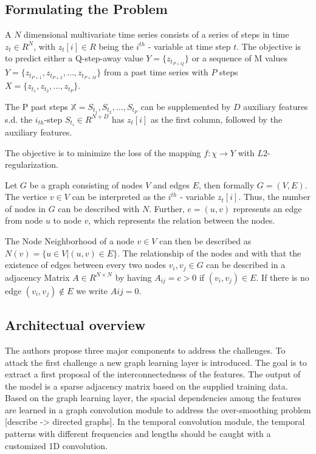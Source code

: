 \documentclass[letterpaper,twocolumn,11pt]{article}
\begin{document}
    \subsection{Formulating the Problem}
    A $N$ dimensional multivariate time series consists of a series of steps in time $z_t \in R^N$, with $z_t[i] \in R$
    being the $i^{th}$ - variable at time step $t$. The objective is to predict either a Q-step-away value
    $Y = \{z_{t_{P+Q}}\}$ or a sequence of M values $Y = \{z_{t_{P+1}}, z_{t_{P+2}},\dots,z_{t_{P+M}}\}$
    from a past time series with $P$ steps $X = \{z_{t_{1}}, z_{t_{2}},\dots,z_{t_{P}}\}$.

    The P past steps  $\mathbb{X} = {S_{t_1}, S_{t_2}, \dots, S_{t_P}}$ can be supplemented by $D$ auxiliary features s.d. the $i_{th}$-step
    $S_{t_i} \in R^{N+D}$ has $z_t[i]$ as the first column, followed by the auxiliary features.

    The objective is to minimize the loss of the mapping $f: \chi \rightarrow Y$ with $L2$-regularization.

    Let $G$ be a graph consisting of nodes $V$ and edges $E$, then formally $G=(V, E)$. The vertice $v \in V$ can be
    interpreted as the $i^{th}$ - variable $z_t[i]$. Thus, the number of nodes in $G$ can be described with $N$.
    Further, $e = (u,v)$ represents an edge from node $u$ to node $v$, which represents the relation between the nodes.

    The Node Neighborhood of a node $v \in V$ can then be described as $N(v) = \{u \in V| (u,v) \in E\}$.
    The relationship of the nodes and with that the existence of edges between every two nodes $v_i,v_j \in G$
    can be described in a adjacency Matrix $A \in R^{N\times N}$ by
    having  $A_{ij} = c > 0$ if $(v_i,v_j) \in E$. If there is no edge $(v_i,v_j) \notin E$ we write $Aij = 0$.

    \subsection{Architectual overview}
    The authors propose three major components to address the challenges. To attack the first challenge a new graph learning layer
    is introduced. The goal is to extract a first proposal of the interconnectedness of the features. The output of the model is a sparse adjacency matrix based on the supplied training data.
    Based on the graph learning layer, the spacial dependencies among the features are learned in a graph convolution module to address the over-smoothing problem [describe -> directed graphs].
    In the temporal convolution module, the temporal patterns with different frequencies and lengths should be caught with a customized 1D convolution.
\end{document}
